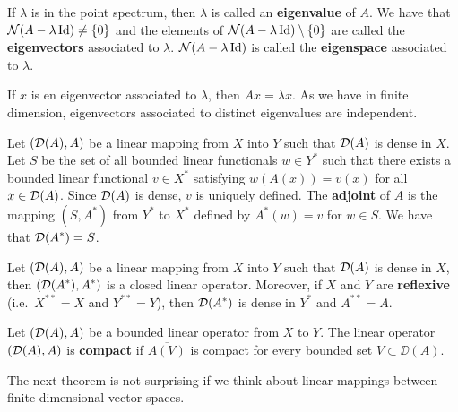 \begin{defn}
If $\lambda$ is in the point spectrum, then $\lambda$ is called
an {\bfseries eigenvalue} of $A$.  We
have that $\mathcal{N}(A-\lambda\operatorname{Id}) \neq \{0\}$ and the elements of
$\mathcal{N}(A-\lambda\operatorname{Id}) \setminus \{0\}$ are
called the {\bfseries eigenvectors}
associated to $\lambda$.  $\mathcal{N}(A-\lambda\operatorname{Id})$ is called the
{\bfseries eigenspace} associated to
$\lambda$.
\end{defn}

If $x$ is en eigenvector associated to $\lambda$, then $Ax = \lambda x$.
As we have in finite dimension, eigenvectors associated to distinct
eigenvalues are independent.

\begin{defn}
Let $(\mathcal{D}(A),A)$ be a linear mapping from $X$ into $Y$ such that
$\mathcal{D}(A)$ is dense in $X$.  Let $S$ be the set of all bounded linear
functionals $\displaystyle w \in Y^\ast$ such that there exists a
bounded linear functional $\displaystyle v \in X^\ast$ satisfying
$w(A(x)) = v(x)$ for all $x \in \mathcal{D}(A)$.
Since $\mathcal{D}(A)$ is dense, $v$ is uniquely defined.  The
{\bfseries adjoint}
of $A$ is the mapping $\displaystyle (S,A^\ast)$ from $\displaystyle Y^\ast$
to $\displaystyle X^\ast$ defined by $\displaystyle A^\ast(w) = v$ for
$w\in S$.  We have that $\displaystyle \mathcal{D}(A^\ast) = S$.
\end{defn}

\begin{theorem}
Let $(\mathcal{D}(A),A)$ be a linear mapping from $X$ into $Y$ such that
$\mathcal{D}(A)$ is dense in $X$, then $\displaystyle (\mathcal{D}(A^\ast),A^\ast)$ is a closed
linear operator.  Moreover, if $X$ and $Y$ are
{\bfseries reflexive}
(i.e.\ $\displaystyle X^{\ast\ast}=X$ and $\displaystyle Y^{\ast\ast} = Y$),
then $\displaystyle \mathcal{D}(A^\ast)$ is dense in
$\displaystyle Y^\ast$ and $\displaystyle A^{\ast\ast} = A$.
\end{theorem}

\begin{defn}
Let $(\mathcal{D}(A),A)$ be a bounded linear operator from $X$ to $Y$.  The
linear operator $(\mathcal{D}(A),A)$ is
{\bfseries compact} if
$\overline{A(V)}$ is compact for every bounded set $V \subset \DD(A)$.
\end{defn}

The next theorem is not surprising if we think about linear mappings
between finite dimensional vector spaces.

